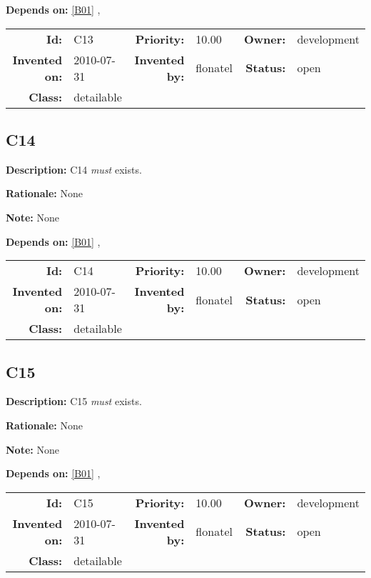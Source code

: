 \textbf{Depends on:} \ref{B01} , 

\par
{\small \begin{center}\begin{tabular}{rlrlrl}
\textbf{Id:} & C13 & \textbf{Priority:} & 10.00 & \textbf{Owner:} & development \\ 
\textbf{Invented on:} & 2010-07-31 & \textbf{Invented by:} & flonatel & \textbf{Status:} & open \\ 
\textbf{Class:} & detailable & & & & \\ 
\end{tabular}\end{center} }%
\subsection{C14}\label{C14}
\textbf{Description:} C14 \textsl{must} exists.

\textbf{Rationale:} None

\textbf{Note:} None

\textbf{Depends on:} \ref{B01} , 

\par
{\small \begin{center}\begin{tabular}{rlrlrl}
\textbf{Id:} & C14 & \textbf{Priority:} & 10.00 & \textbf{Owner:} & development \\ 
\textbf{Invented on:} & 2010-07-31 & \textbf{Invented by:} & flonatel & \textbf{Status:} & open \\ 
\textbf{Class:} & detailable & & & & \\ 
\end{tabular}\end{center} }%
\subsection{C15}\label{C15}
\textbf{Description:} C15 \textsl{must} exists.

\textbf{Rationale:} None

\textbf{Note:} None

\textbf{Depends on:} \ref{B01} , 

\par
{\small \begin{center}\begin{tabular}{rlrlrl}
\textbf{Id:} & C15 & \textbf{Priority:} & 10.00 & \textbf{Owner:} & development \\ 
\textbf{Invented on:} & 2010-07-31 & \textbf{Invented by:} & flonatel & \textbf{Status:} & open \\ 
\textbf{Class:} & detailable & & & & \\ 
\end{tabular}\end{center} }%
